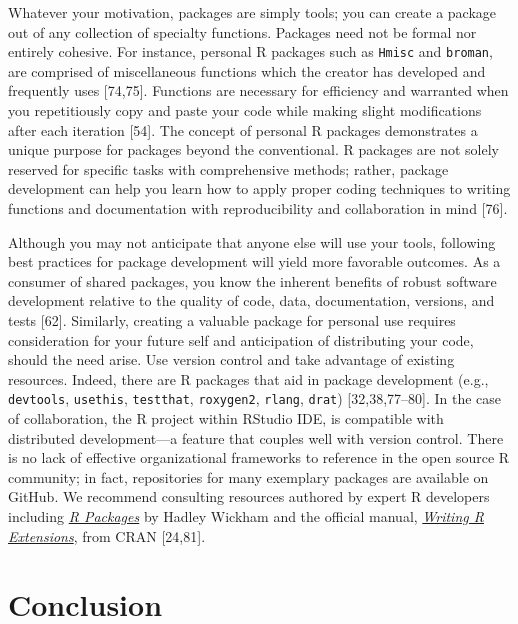 \documentclass[10pt,letterpaper]{article}
\begin{document}
Whatever your motivation, packages are simply tools; you can create a
package out of any collection of specialty functions. Packages need not
be formal nor entirely cohesive. For instance, personal R packages such
as \texttt{Hmisc} and \texttt{broman}, are comprised of miscellaneous
functions which the creator has developed and frequently uses
{[}74,75{]}. Functions are necessary for efficiency and warranted when
you repetitiously copy and paste your code while making slight
modifications after each iteration {[}54{]}. The concept of personal R
packages demonstrates a unique purpose for packages beyond the
conventional. R packages are not solely reserved for specific tasks with
comprehensive methods; rather, package development can help you learn
how to apply proper coding techniques to writing functions and
documentation with reproducibility and collaboration in mind {[}76{]}.

Although you may not anticipate that anyone else will use your tools,
following best practices for package development will yield more
favorable outcomes. As a consumer of shared packages, you know the
inherent benefits of robust software development relative to the quality
of code, data, documentation, versions, and tests {[}62{]}. Similarly,
creating a valuable package for personal use requires consideration for
your future self and anticipation of distributing your code, should the
need arise. Use version control and take advantage of existing
resources. Indeed, there are R packages that aid in package development
(e.g., \texttt{devtools}, \texttt{usethis}, \texttt{testthat},
\texttt{roxygen2}, \texttt{rlang}, \texttt{drat}) {[}32,38,77--80{]}. In
the case of collaboration, the R project within RStudio IDE, is
compatible with distributed development---a feature that couples well
with version control. There is no lack of effective organizational
frameworks to reference in the open source R community; in fact,
repositories for many exemplary packages are available on GitHub. We
recommend consulting resources authored by expert R developers including
\href{https://r-pkgs.org/}{\emph{R Packages}} by Hadley Wickham and the
official manual,
\href{https://cran.r-project.org/doc/manuals/r-release/R-exts.html}{\emph{Writing
R Extensions}}, from CRAN {[}24,81{]}.

\hypertarget{conclusion}{%
\section{Conclusion}\label{conclusion}}
\end{document}
